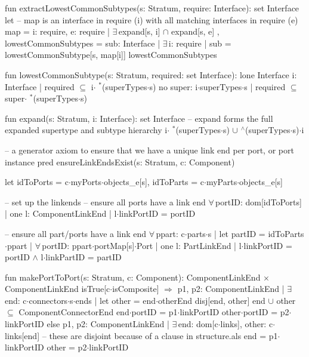 fun extractLowestCommonSubtypes(s: Stratum, require: Interface): set Interface
{
  let
    -- map is an interface in require (i) with all matching interfaces in require (e)
    map =
    { i: require, e: require |
      $\exists\,$expand[s, i] $\cap$ expand[s, e] },
    lowestCommonSubtypes =
    {
      sub: Interface |
        $\exists\,$i: require |
          sub = lowestCommonSubtype[s, map[i]]
    }
  {
    lowestCommonSubtypes
  }
}

fun lowestCommonSubtype(s: Stratum, required: set Interface): lone Interface
{
  { i: Interface |
    {
      required $\subseteq$ i$\cdot$ $\!\!\!^\ast\!$(superTypes$\cdot$s)
      no super: i$\cdot$superTypes$\cdot$s |
        required $\subseteq$ super$\cdot$ $\!\!\!^\ast\!$(superTypes$\cdot$s)
    }
  }
}

fun expand(s: Stratum, i: Interface): set Interface
{
  -- expand forms the full expanded supertype and subtype hierarchy
  i$\cdot$ $\!\!\!^\ast\!$(superTypes$\cdot$s) $\cup$   $\!\!\!^\wedge\!$(superTypes$\cdot$s)$\cdot$i
}


-- a generator axiom to ensure that we have a unique link end per port, or port instance
pred ensureLinkEndsExist(s: Stratum, c: Component)
{
  let
    idToPorts = c$\cdot$myPorts$\cdot$objects_e[s],
    idToParts = c$\cdot$myParts$\cdot$objects_e[s]
  {
    -- set up the linkends
    -- ensure all ports have a link end
    $\forall\,$portID: dom[idToPorts] |
      one l: ComponentLinkEnd |
        l$\cdot$linkPortID = portID
        
    -- ensure all part/ports have a link end
    $\forall\,$ppart: c$\cdot$parts$\cdot$s |
      let partID = idToParts$\cdot$ppart | 
        $\forall\,$portID: ppart$\cdot$portMap[s]$\cdot$Port |
          one l: PartLinkEnd |
            l$\cdot$linkPortID = portID $\wedge$ l$\cdot$linkPartID = partID
  }
}

fun makePortToPort(s: Stratum, c: Component): ComponentLinkEnd$\,\times\,$ComponentLinkEnd
{
  isTrue[c$\cdot$isComposite] $\Longrightarrow$
  { p1, p2: ComponentLinkEnd |
    $\exists\,$end: c$\cdot$connectors$\cdot$s$\cdot$ends | let other = end$\cdot$otherEnd
    {
      disj[end, other]
      end $\cup$ other $\subseteq$ ComponentConnectorEnd
      end$\cdot$portID = p1$\cdot$linkPortID
      other$\cdot$portID = p2$\cdot$linkPortID
    }
  }
  else
  { p1, p2: ComponentLinkEnd |
    $\exists\,$end: dom[c$\cdot$links], other: c$\cdot$links[end]
    {
      -- these are disjoint because of a clause in structure.als
      end = p1$\cdot$linkPortID
      other = p2$\cdot$linkPortID
    }  
  }  
}

